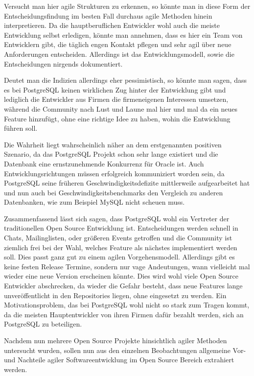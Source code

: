 Versucht man hier agile Strukturen zu erkennen, so könnte man in diese Form der Entscheidungsfindung im besten Fall durchaus agile Methoden hinein interpretieren. Da die hauptberuflichen Entwickler wohl auch die meiste Entwicklung selbst erledigen, könnte man annehmen, dass es hier ein Team von Entwicklern gibt, die täglich engen Kontakt pflegen und sehr agil über neue Anforderungen entscheiden. Allerdings ist das Entwicklungsmodell, sowie die Entscheidungen nirgends dokumentiert.

Deutet man die Indizien allerdings eher pessimistisch, so könnte man sagen, dass es bei PostgreSQL keinen wirklichen Zug hinter der Entwicklung gibt und lediglich die Entwickler aus Firmen die firmeneigenen Interessen umsetzen, während die Community nach Lust und Laune mal hier und mal da ein neues Feature hinzufügt, ohne eine richtige Idee zu haben, wohin die Entwicklung führen soll.

Die Wahrheit liegt wahrscheinlich näher an dem erstgenannten positiven Szenario, da das PostgreSQL Projekt schon sehr lange existiert und die Datenbank eine ernstzunehmende Konkurrenz für Oracle ist. Auch Entwicklungsrichtungen müssen erfolgreich kommuniziert worden sein, da PostgreSQL seine früheren Geschwindigkeitsdefizite mittlerweile aufgearbeitet hat und nun auch bei Geschwindigkeitsbenchmarks den Vergleich zu anderen Datenbanken, wie zum Beispiel MySQL nicht scheuen muss.

Zusammenfassend lässt sich sagen, dass PostgreSQL wohl ein Vertreter der traditionellen Open Source Entwicklung ist. Entscheidungen werden schnell in Chats, Mailinglisten, oder größeren Events getroffen und die Community ist ziemlich frei bei der Wahl, welches Feature als nächstes implementiert werden soll. Dies passt ganz gut zu einem agilen Vorgehensmodell. Allerdings gibt es keine festen Release Termine, sondern nur vage Andeutungen, wann vielleicht mal wieder eine neue Version erscheinen könnte. Dies wird wohl viele Open Source Entwickler abschrecken, da wieder die Gefahr besteht, dass neue Features lange unveröffentlicht in den Repositories liegen, ohne eingesetzt zu werden. Ein Motivationsproblem, das bei PostgreSQL wohl nicht so stark zum Tragen kommt, da die meisten Hauptentwickler von ihren Firmen dafür bezahlt werden, sich an PostgreSQL zu beteiligen.

Nachdem nun mehrere Open Source Projekte hinsichtlich agiler Methoden untersucht wurden, sollen nun aus den einzelnen Beobachtungen allgemeine Vor- und Nachteile agiler Softwareentwicklung im Open Source Bereich extrahiert werden.
